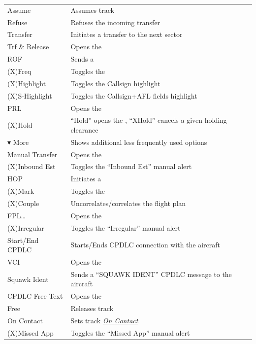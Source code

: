 \documentclass[a4paper,oneside,11pt]{memoir}
\newcommand{\tagref}[1]{\textit{\hyperref[#1]{\StrDel{#1}{tag:}}}}
\newcommand{\stateref}[1]{\textit{\hyperref[state:#1]{#1}}}
\newcommand{\winref}[1]{\textit{\titleref{#1}}}
\begin{document}
\begin{longtable}{p{5cm} p{7.5cm}}
Assume                    & Assumes track\\
Refuse                    & Refuses the incoming transfer\\
Transfer                  & Initiates a transfer to the next sector\\
Trf \& Release            & Opens the \winref{menu:xfrrel}\\
ROF                       & Sends a \winref{menu:rof}\\
(X)Freq                   & Toggles the \tagref{tag:Frequency dot}\\
(X)Highlight              & Toggles the Callsign highlight\\
(X)S-Highlight            & Toggles the Callsign+AFL fields highlight\\
PRL                       & Opens the \winref{menu:prl}\\
(X)Hold                   & “Hold” opens the \winref{menu:hold}, “XHold” cancels a given holding clearance\\
$\blacktriangledown$ More & Shows additional less frequently used options\\
Manual Transfer           & Opens the \winref{menu:mxfr}\\
(X)Inbound Est            & Toggles the “Inbound Est” manual alert\\
HOP                       & Initiates a \winref{win:hop}\\
(X)Mark                   & Toggles the \tagref{tag:Mark dot}\\
(X)Couple                 & Uncorrelates/correlates the flight plan\\
FPL…                      & Opens the \winref{win:fpw}\\
(X)Irregular              & Toggles the “Irregular” manual alert\\
Start/End CPDLC           & Starts/Ends CPDLC connection with the aircraft\\
VCI                       & Opens the \winref{menu:vci}\\
Squawk Ident              & Sends a “SQUAWK IDENT” CPDLC message to the aircraft\\
CPDLC Free Text           & Opens the \winref{menu:dlftm}\\
Free                      & Releases track\\
On Contact                & Sets track \stateref{On Contact}\footnotemark[1]\\
(X)Missed App             & Toggles the “Missed App” manual alert\\
\end{longtable}
\end{document}
